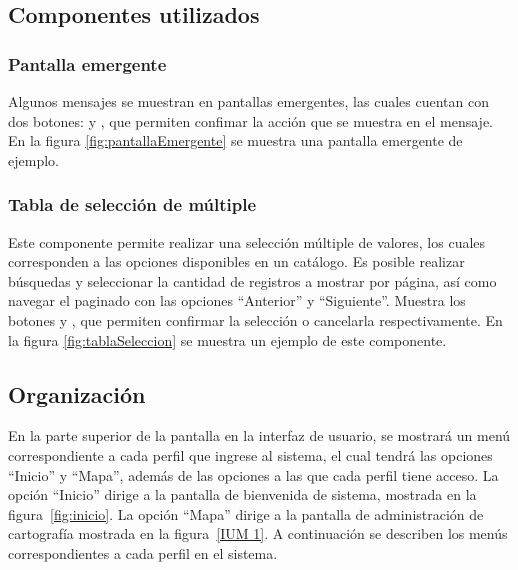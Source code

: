 \subsection{Componentes utilizados}

  \subsubsection{Pantalla emergente}
    Algunos mensajes se muestran en pantallas emergentes, las cuales cuentan con dos botones:  y , que permiten confimar la acción que se muestra en el mensaje.
    En la figura \ref{fig:pantallaEmergente} se muestra una pantalla emergente de ejemplo.
  
    \subsubsection{Tabla de selección de múltiple}
      Este componente permite realizar una selección múltiple de valores, los cuales corresponden a las opciones disponibles en un catálogo. Es posible realizar búsquedas y seleccionar la cantidad de registros a mostrar por página, así como navegar el paginado con las opciones ``Anterior'' y ``Siguiente''.
      Muestra los botones  y , que permiten confirmar la selección o cancelarla respectivamente.
      En la figura \ref{fig:tablaSeleccion} se muestra un ejemplo de este componente. 
  
  
\subsection{Organización}
En la parte superior de la pantalla en la interfaz de usuario, se mostrará un menú correspondiente a cada perfil que ingrese al sistema, el cual tendrá las opciones ``Inicio'' y ``Mapa'', además de las opciones a las que cada perfil tiene acceso. La opción ``Inicio'' dirige a la pantalla de bienvenida de sistema, mostrada en la figura~\ref{fig:inicio}. La opción ``Mapa'' dirige a la pantalla de administración de cartografía mostrada en la figura~\ref{IUM 1}. A continuación se describen los menús correspondientes a cada perfil en el sistema.

